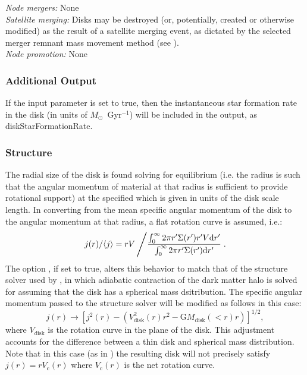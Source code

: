 \noindent\emph{Node mergers:} None\\

\noindent\emph{Satellite merging:} Disks may be destroyed (or, potentially, created or otherwise modified) as the result of a satellite merging event, as dictated by the selected merger remnant mass movement method (see ).\\

\noindent\emph{Node promotion:} None\\

\subsubsection{Additional Output}

If the {\normalfont \ttfamily [diskOutputStarFormationRate]} input parameter is set to true, then the instantaneous star formation rate in the disk (in units of $M_\odot$~Gyr$^{-1}$) will be included in the output, as {\normalfont \ttfamily diskStarFormationRate}.

\subsubsection{Structure}

The radial size of the disk is found solving for equilibrium (i.e. the radius is such that the angular momentum of material at that radius is sufficient to provide rotational support) at the specified {\normalfont \ttfamily [diskStructureSolverRadius]} which is given in units of the disk scale length. In converting from the mean specific angular momentum of the disk to the angular momentum at that radius, a flat rotation curve is assumed, i.e.:
\begin{equation}
 j(r)/\langle j \rangle = r V \left/ {\int_0^\infty 2 \pi r^\prime \Sigma(r^\prime) r^\prime V \mathrm{d} r^\prime \over \int_0^\infty 2 \pi r^\prime \Sigma(r^\prime) \mathrm{d} r^\prime} \right. .
\end{equation}
The option {\normalfont {}}, if set to {\normalfont \ttfamily true}, alters this behavior to match that of the structure solver used by \cite{cole_hierarchical_2000}, in which adiabatic contraction of the dark matter halo is solved for assuming that the disk has a spherical mass dsitribution. The specific angular momentum passed to the structure solver will be modified as follows in this case:
\begin{equation}
 j(r) \rightarrow \left[ j^2(r) - \left( V_\mathrm{disk}^2(r) r^2 - \mathrm{G} M_\mathrm{disk}(<r) r \right) \right]^{1/2},
\end{equation}
where $V_\mathrm{disk}$ is the rotation curve in the plane of the disk. This adjustment accounts for the difference between a thin disk and spherical mass distribution. Note that in this case (as in \citealt{cole_hierarchical_2000}) the resulting disk will not precisely satisfy $j(r) = r V_\mathrm{c}(r)$ where $V_\mathrm{c}(r)$ is the net rotation curve.

